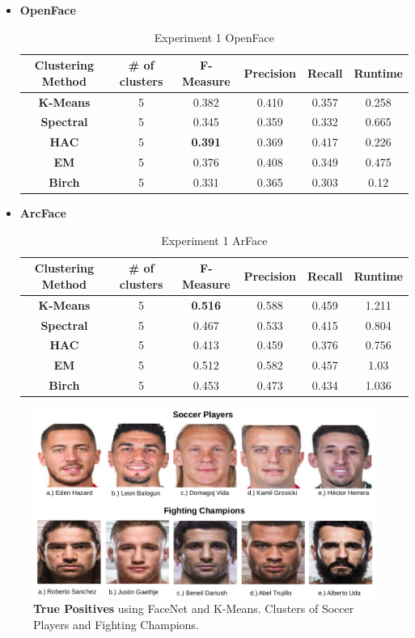 \documentclass[12pt,english]{article}
\begin{document}
\begin{itemize}
\item \textbf{OpenFace}
\begin{table}[H]
\centering
\begin{tabular}{||c c c c c c||} 
 \hline
 Clustering Method & \# of clusters & F-Measure & Precision & Recall & Runtime\\ [0.5ex]
 \hline\hline
 \textbf{K-Means} & 5 & 0.382 & 0.410 & 0.357 & 0.258\\ 
 \hline
  \textbf{Spectral} & 5 & 0.345 & 0.359 & 0.332 & 0.665\\
 \hline
 \textbf{HAC} & 5 & \textbf{0.391} & 0.369 & 0.417 & 0.226\\
 \hline
 \textbf{EM} & 5 & 0.376 & 0.408 & 0.349 & 0.475\\
 \hline
 \textbf{Birch} & 5 & 0.331 & 0.365 & 0.303 & 0.12\\
 \hline
\end{tabular}
\caption{Experiment 1 OpenFace}
\label{table:ex1openface}
\end{table}

\item \textbf{ArcFace}
\begin{table}[H]
\centering
\begin{tabular}{||c c c c c c||} 
 \hline
 Clustering Method & \# of clusters & F-Measure & Precision & Recall & Runtime\\ [0.5ex]
 \hline\hline
 \textbf{K-Means} & 5 & \textbf{0.516} & 0.588 & 0.459 & 1.211\\ 
 \hline
  \textbf{Spectral} & 5 & 0.467 & 0.533 & 0.415 & 0.804\\
 \hline
 \textbf{HAC} & 5 & 0.413 & 0.459 & 0.376 & 0.756\\
 \hline
 \textbf{EM} & 5 & 0.512 & 0.582 & 0.457 & 1.03\\
 \hline
 \textbf{Birch} & 5 & 0.453 & 0.473 & 0.434 & 1.036\\
 \hline
\end{tabular}
\caption{Experiment 1 ArFace}
\label{table:ex1arcface}
\end{table}

\end{itemize}


\begin{figure}[H]
 \centering
    \includegraphics[width=\columnwidth]{figures/soccer_tp.png}
    \caption{\textbf{True Positives} using FaceNet and K-Means. Clusters of Soccer Players and Fighting Champions.}
    \label{fig:ex1tp}
\end{figure}
\end{document}
